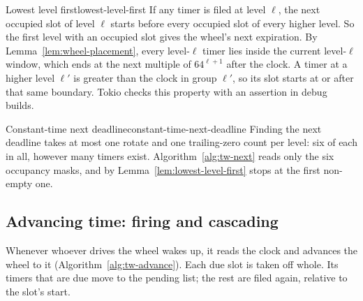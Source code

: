 \begin{lemma}{Lowest level first}{lowest-level-first}
    If any timer is filed at level $\ell$, the next occupied slot of level $\ell$ starts before every occupied slot of every higher level. So the first level with an occupied slot gives the wheel's next expiration.
    \why By Lemma~\ref{lem:wheel-placement}, every level-$\ell$ timer lies inside the current level-$\ell$ window, which ends at the next multiple of $64^{\ell+1}$ after the clock. A timer at a higher level $\ell'$ is greater than the clock in group $\ell'$, so its slot starts at or after that same boundary. Tokio checks this property with an assertion in debug builds.
\end{lemma}

\begin{lemma}{Constant-time next deadline}{constant-time-next-deadline}
    Finding the next deadline takes at most one rotate and one trailing-zero count per level: six of each in all, however many timers exist.
    \why Algorithm~\ref{alg:tw-next} reads only the six occupancy masks, and by Lemma~\ref{lem:lowest-level-first} stops at the first non-empty one.
\end{lemma}

\subsection{Advancing time: firing and cascading}

Whenever whoever drives the wheel wakes up, it reads the clock and advances the wheel to it (Algorithm~\ref{alg:tw-advance}). Each due slot is taken off whole. Its timers that are due move to the pending list; the rest are filed again, relative to the slot's start.

